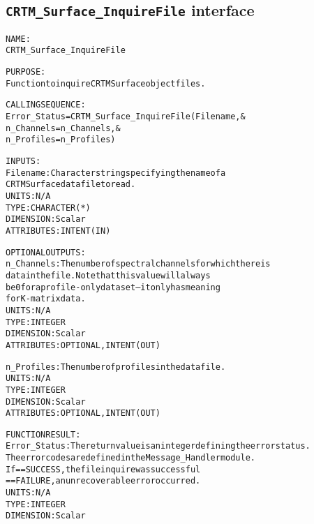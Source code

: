 \subsection{\texttt{CRTM\_Surface\_InquireFile} interface}
  \label{sec:CRTM_Surface_InquireFile_interface}
  \begin{alltt}
 
  NAME:
        CRTM_Surface_InquireFile
 
  PURPOSE:
        Function to inquire CRTM Surface object files.
 
  CALLING SEQUENCE:
        Error_Status = CRTM_Surface_InquireFile( Filename               , &
                                                 n_Channels = n_Channels, &
                                                 n_Profiles = n_Profiles  )
 
  INPUTS:
        Filename:       Character string specifying the name of a
                        CRTM Surface data file to read.
                        UNITS:      N/A
                        TYPE:       CHARACTER(*)
                        DIMENSION:  Scalar
                        ATTRIBUTES: INTENT(IN)
 
  OPTIONAL OUTPUTS:
        n_Channels:     The number of spectral channels for which there is
                        data in the file. Note that this value will always
                        be 0 for a profile-only dataset-- it only has meaning
                        for K-matrix data.
                        UNITS:      N/A
                        TYPE:       INTEGER
                        DIMENSION:  Scalar
                        ATTRIBUTES: OPTIONAL, INTENT(OUT)
 
        n_Profiles:     The number of profiles in the data file.
                        UNITS:      N/A
                        TYPE:       INTEGER
                        DIMENSION:  Scalar
                        ATTRIBUTES: OPTIONAL, INTENT(OUT)
 
  FUNCTION RESULT:
        Error_Status:   The return value is an integer defining the error status.
                        The error codes are defined in the Message_Handler module.
                        If == SUCCESS, the file inquire was successful
                           == FAILURE, an unrecoverable error occurred.
                        UNITS:      N/A
                        TYPE:       INTEGER
                        DIMENSION:  Scalar
 
  \end{alltt}
